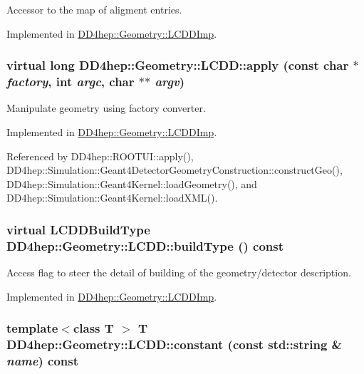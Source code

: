 Accessor to the map of aligment entries. 

Implemented in \hyperlink{class_d_d4hep_1_1_geometry_1_1_l_c_d_d_imp_a3db8df3854b34f1f60a091c135274bc4}{DD4hep::Geometry::LCDDImp}.\hypertarget{class_d_d4hep_1_1_geometry_1_1_l_c_d_d_ab47f82e5a5bfda6f58624b3553a08c68}{
\subsubsection[{apply}]{\setlength{\rightskip}{0pt plus 5cm}virtual long DD4hep::Geometry::LCDD::apply (const char $\ast$ {\em factory}, \/  int {\em argc}, \/  char $\ast$$\ast$ {\em argv})}}
\label{class_d_d4hep_1_1_geometry_1_1_l_c_d_d_ab47f82e5a5bfda6f58624b3553a08c68}


Manipulate geometry using factory converter. 

Implemented in \hyperlink{class_d_d4hep_1_1_geometry_1_1_l_c_d_d_imp_a3dfdf0180fa0a61067bd1f12fa15ecd6}{DD4hep::Geometry::LCDDImp}.

Referenced by DD4hep::ROOTUI::apply(), DD4hep::Simulation::Geant4DetectorGeometryConstruction::constructGeo(), DD4hep::Simulation::Geant4Kernel::loadGeometry(), and DD4hep::Simulation::Geant4Kernel::loadXML().\hypertarget{class_d_d4hep_1_1_geometry_1_1_l_c_d_d_a73400f14f6384e1c84470595fc3667fd}{
\subsubsection[{buildType}]{\setlength{\rightskip}{0pt plus 5cm}virtual {\bf LCDDBuildType} DD4hep::Geometry::LCDD::buildType () const}}
\label{class_d_d4hep_1_1_geometry_1_1_l_c_d_d_a73400f14f6384e1c84470595fc3667fd}


Access flag to steer the detail of building of the geometry/detector description. 

Implemented in \hyperlink{class_d_d4hep_1_1_geometry_1_1_l_c_d_d_imp_ab38d01be5ddf4db043ea23a77b04a21a}{DD4hep::Geometry::LCDDImp}.\hypertarget{class_d_d4hep_1_1_geometry_1_1_l_c_d_d_ae0b36775a484f3b7e6f7b3d5910062a2}{
\subsubsection[{constant}]{\setlength{\rightskip}{0pt plus 5cm}template$<$class T $>$ {\bf T} DD4hep::Geometry::LCDD::constant (const std::string \& {\em name}) const}}
\label{class_d_d4hep_1_1_geometry_1_1_l_c_d_d_ae0b36775a484f3b7e6f7b3d5910062a2}


